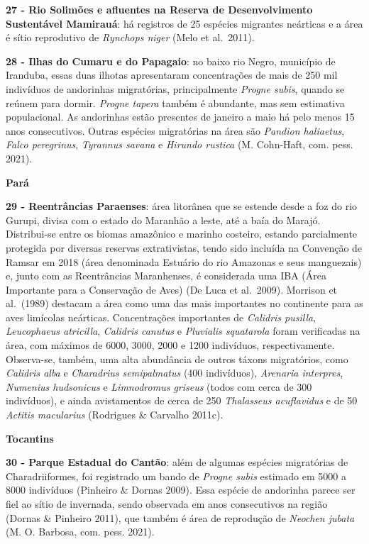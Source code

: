 \documentclass[
  oneside]{scrbook}
\begin{document}
\textbf{27 - Rio Solimões e afluentes na Reserva de Desenvolvimento Sustentável Mamirauá}: há registros de 25 espécies migrantes neárticas e a área é sítio reprodutivo de \emph{Rynchops niger} (Melo et al.~2011).

\textbf{28 - Ilhas do Cumaru e do Papagaio}: no baixo rio Negro, município de Iranduba, essas duas ilhotas apresentaram concentrações de mais de 250 mil indivíduos de andorinhas migratórias, principalmente \emph{Progne subis}, quando se reúnem para dormir. \emph{Progne tapera} também é abundante, mas sem estimativa populacional. As andorinhas estão presentes de janeiro a maio há pelo menos 15 anos consecutivos. Outras espécies migratórias na área são \emph{Pandion haliaetus}, \emph{Falco peregrinus}, \emph{Tyrannus savana} e \emph{Hirundo rustica} (M. Cohn-Haft, com. pess. 2021).

\textbf{Pará}

\textbf{29 - Reentrâncias Paraenses}: área litorânea que se estende desde a foz do rio Gurupi, divisa com o estado do Maranhão a leste, até a baía do Marajó. Distribui-se entre os biomas amazônico e marinho costeiro, estando parcialmente protegida por diversas reservas extrativistas, tendo sido incluída na Convenção de Ramsar em 2018 (área denominada Estuário do rio Amazonas e seus manguezais) e, junto com as Reentrâncias Maranhenses, é considerada uma IBA (Área Importante para a Conservação de Aves) (De Luca et al.~2009). Morrison et al.~(1989) destacam a área como uma das mais importantes no continente para as aves limícolas neárticas. Concentrações importantes de \emph{Calidris pusilla}, \emph{Leucophaeus atricilla}, \emph{Calidris canutus} e \emph{Pluvialis squatarola} foram verificadas na área, com máximos de 6000, 3000, 2000 e 1200 indivíduos, respectivamente. Observa-se, também, uma alta abundância de outros táxons migratórios, como \emph{Calidris alba} e \emph{Charadrius semipalmatus} (400 indivíduos), \emph{Arenaria interpres}, \emph{Numenius hudsonicus} e \emph{Limnodromus griseus} (todos com cerca de 300 indivíduos), e ainda avistamentos de cerca de 250 \emph{Thalasseus acuflavidus} e de 50 \emph{Actitis macularius} (Rodrigues \& Carvalho 2011c).

\textbf{Tocantins}

\textbf{30 - Parque Estadual do Cantão}: além de algumas espécies migratórias de Charadriiformes, foi registrado um bando de \emph{Progne subis} estimado em 5000 a 8000 indivíduos (Pinheiro \& Dornas 2009). Essa espécie de andorinha parece ser fiel ao sítio de invernada, sendo observada em anos consecutivos na região (Dornas \& Pinheiro 2011), que também é área de reprodução de \emph{Neochen jubata} (M. O. Barbosa, com. pess. 2021).
\end{document}
